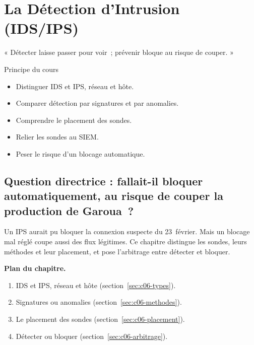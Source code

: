 
\chapter{La Détection d'Intrusion (IDS/IPS)}
\label{chap:idsips}

\epigraph{%
    « Détecter laisse passer pour voir~; prévenir bloque au risque de couper. »%
}{Principe du cours}


\begin{boxobjectifs}
\begin{itemize}
    \item Distinguer IDS et IPS, réseau et hôte.
    \item Comparer détection par signatures et par anomalies.
    \item Comprendre le placement des sondes.
    \item Relier les sondes au SIEM.
    \item Peser le risque d'un blocage automatique.
\end{itemize}
\end{boxobjectifs}

\bigskip

\section*{Question directrice : fallait-il bloquer automatiquement, au risque de couper la production de Garoua~?}

Un IPS aurait pu bloquer la connexion suspecte du 23~février. Mais un blocage
mal réglé coupe aussi des flux légitimes. Ce chapitre distingue les sondes,
leurs méthodes et leur placement, et pose l'arbitrage entre détecter et
bloquer.

\medskip
\textbf{Plan du chapitre.}
\begin{enumerate}
    \item IDS et IPS, réseau et hôte (section~\ref{sec:c06-types}).
    \item Signatures ou anomalies (section~\ref{sec:c06-methodes}).
    \item Le placement des sondes (section~\ref{sec:c06-placement}).
    \item Détecter ou bloquer (section~\ref{sec:c06-arbitrage}).
\end{enumerate}

